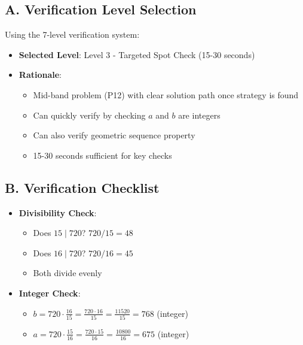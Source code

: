 \documentclass[11pt]{article}
\begin{document}
\begin{verificationbox}
\subsection*{A. Verification Level Selection}

Using the 7-level verification system:

\begin{itemize}[leftmargin=*]
    \item \textbf{Selected Level}: Level 3 - Targeted Spot Check (15-30 seconds)
    \item \textbf{Rationale}: 
    \begin{itemize}
        \item Mid-band problem (P12) with clear solution path once strategy is found
        \item Can quickly verify by checking $a$ and $b$ are integers
        \item Can also verify geometric sequence property
        \item 15-30 seconds sufficient for key checks
    \end{itemize}
\end{itemize}

\subsection*{B. Verification Checklist}
\begin{itemize}[leftmargin=*]
    \item \textbf{Divisibility Check}: 
    \begin{itemize}
        \item Does $15 \mid 720$? $720 / 15 = 48$ \checkmark
        \item Does $16 \mid 720$? $720 / 16 = 45$ \checkmark
        \item Both divide evenly
    \end{itemize}
    
    \item \textbf{Integer Check}:
    \begin{itemize}
        \item $b = 720 \cdot \frac{16}{15} = \frac{720 \cdot 16}{15} = \frac{11520}{15} = 768$ \checkmark (integer)
        \item $a = 720 \cdot \frac{15}{16} = \frac{720 \cdot 15}{16} = \frac{10800}{16} = 675$ \checkmark (integer)
    \end{itemize}
    

\end{itemize}
\end{verificationbox}
\end{document}
